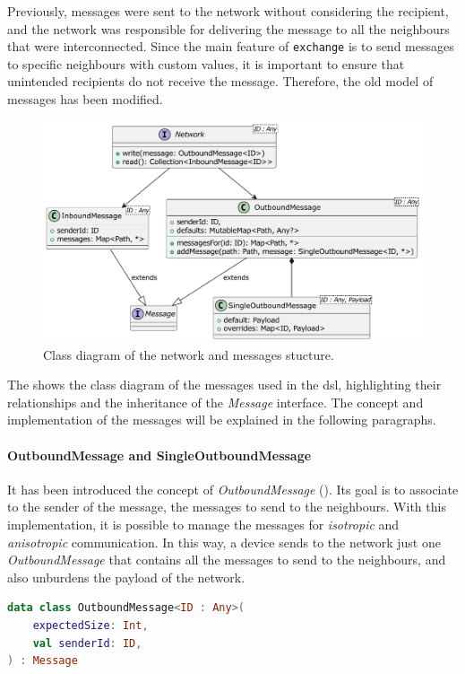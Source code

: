 Previously, messages were sent to the network without considering the recipient, and the network was responsible for
delivering the message to all the neighbours that were interconnected.
Since the main feature of \texttt{exchange} is to send messages to specific neighbours with custom values, it is important
to ensure that unintended recipients do not receive the message.
Therefore, the old model of messages has been modified.

\begin{figure}
    \centering
    \includegraphics[width=\textwidth]{figures/messages-diagram}
    \caption{Class diagram of the network and messages stucture.}
    \label{fig:message-diagram}
\end{figure}

The  shows the class diagram of the messages used in the \ac{dsl}, highlighting their relationships
and the inheritance of the \emph{Message} interface.
The concept and implementation of the messages will be explained in the following paragraphs.

\paragraph{OutboundMessage and SingleOutboundMessage}
It has been introduced the concept of \emph{OutboundMessage} ().
Its goal is to associate to the sender of the message, the messages to send to the neighbours.
With this implementation, it is possible to manage the messages for \emph{isotropic} and \emph{anisotropic} communication.
In this way, a device sends to the network just one \emph{OutboundMessage} that contains all the messages to send to the neighbours,
and also unburdens the payload of the network.

\begin{lstlisting}[language=kt,label={lst:outbound}, caption={Outbound message data class.}]
data class OutboundMessage<ID : Any>(
    expectedSize: Int,
    val senderId: ID,
) : Message
\end{lstlisting}

